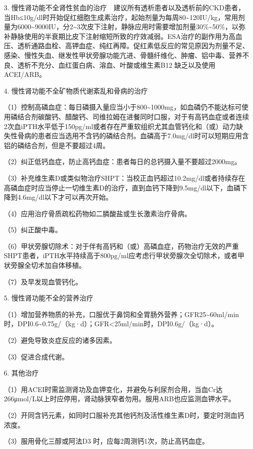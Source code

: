 3.
慢性肾功能不全肾性贫血的治疗　建议所有透析患者以及透析前的CKD患者，当Hb≤10g/dl时开始促红细胞生成素治疗，起始剂量为每周80\textasciitilde{}120IU/kg，常用剂量为6000\textasciitilde{}9000IU，分2\textasciitilde{}3次皮下注射，静脉应用时需要增加剂量30\%\textasciitilde{}50\%，以弥补静脉使用的半衰期比皮下注射缩短所致的疗效减弱。ESA治疗的副作用为高血压、透析通路血栓、高钾血症、纯红再障。促红素低反应的常见原因为剂量不足、感染、慢性失血、继发性甲状旁腺功能亢进、骨髓纤维化、肿瘤、铝中毒、营养不良、透析不充分、血红蛋白病、溶血、叶酸或维生素B{12}
缺乏以及使用ACEI/ARB。

4. 慢性肾功能不全矿物质代谢紊乱和骨病的治疗

（1）控制高磷血症：每日磷摄入量应当小于800\textasciitilde{}1000mg，如血磷仍不能达标可使用磷结合剂碳酸钙、醋酸钙、司维拉姆在进餐同时口服，对于有高钙血症或者连续2次血iPTH水平低于150pg/ml或者存在严重软组织尤其血管钙化和（或）动力缺失性骨病的患者应当选用不含钙的磷结合剂。血磷高于7.0mg/dl时可以短期应用含铝的磷结合剂，但是不要超过4周。

（2）纠正低钙血症，防止高钙血症：患者每日的总钙摄入量不要超过2000mg。

（3）补充维生素D或类似物治疗SHPT：当校正血钙超过10.2mg/dl或者持续存在高磷血症时应当停止一切维生素D的治疗，直到血钙下降到9.5mg/dl以下，血磷下降到4.6mg/dl以下才可以再次开始。

（4）应用治疗骨质疏松药物如二膦酸盐或生长激素治疗骨病。

（5）纠正酸中毒。

（6）甲状旁腺切除术：对于伴有高钙和（或）高磷血症，药物治疗无效的严重SHPT患者，iPTH水平持续高于800pg/ml应考虑行甲状旁腺次全切除术，或者甲状旁腺全切术加自体移植。

（7）及早发现血管钙化。

5. 慢性肾功能不全的营养治疗

（1）增加营养物质的补充，口服优于鼻饲和全胃肠外营养；GFR25\textasciitilde{}60ml/min时，DPI0.6\textasciitilde{}0.75g/（kg·d）；GFR\textless{}25ml/min时，DPI0.6g/（kg·d）。

（2）避免导致炎症反应的诸多因素。

（3）促进合成代谢。

6. 其他治疗

（1）用ACEI时需监测肾功及血钾变化，并避免与利尿剂合用，当血Cr达266μmol/L以上时应停用，肾动脉狭窄者勿用。服用ARB也应监测血钾水平。

（2）开同含钙元素，如同时口服补充其他钙剂及活性维生素D时，要定时测血钙浓度。

（3）服用骨化三醇或阿法D{3} 时，应每2周测钙1次，防止高钙血症。

